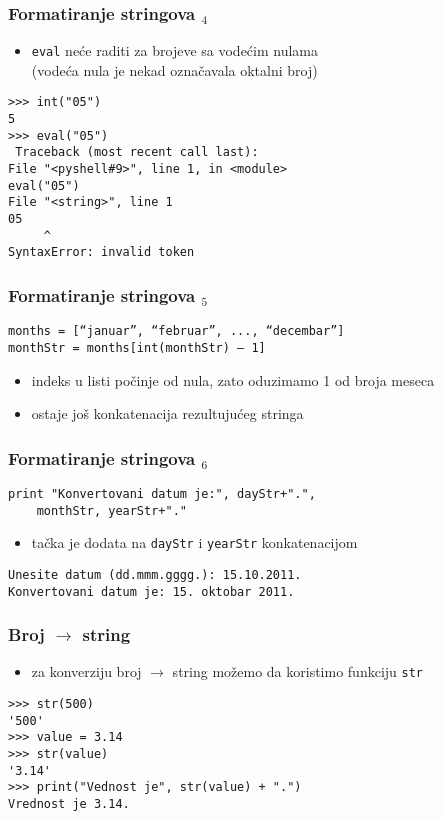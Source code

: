 \documentclass[utf8,compress]{beamer}
\begin{document}
\begin{frame}[fragile]
  \frametitle{Formatiranje stringova $_4$}
  \begin{itemize}
    \item \texttt{eval} neće raditi za brojeve sa vodećim nulama\\ (vodeća nula je nekad označavala oktalni broj)
  \end{itemize}
\begin{verbatim}
>>> int("05")
5
>>> eval("05")
 Traceback (most recent call last):
File "<pyshell#9>", line 1, in <module>
eval("05")
File "<string>", line 1
05
     ^
SyntaxError: invalid token
\end{verbatim}
\end{frame}

\begin{frame}[fragile]
  \frametitle{Formatiranje stringova $_5$}
\begin{verbatim}
months = [“januar”, “februar”, ..., “decembar”]
monthStr = months[int(monthStr) – 1]
\end{verbatim}
  \begin{itemize}
    \item indeks u listi počinje od nula, zato oduzimamo 1 od broja meseca
    \item ostaje još konkatenacija rezultujućeg stringa
  \end{itemize}
\end{frame}

\begin{frame}[fragile]
  \frametitle{Formatiranje stringova $_6$}
\begin{verbatim}
print "Konvertovani datum je:", dayStr+".", 
    monthStr, yearStr+"."
\end{verbatim}
  \begin{itemize}
    \item tačka je dodata na \texttt{dayStr} i \texttt{yearStr} konkatenacijom
  \end{itemize}
\begin{verbatim}
Unesite datum (dd.mmm.gggg.): 15.10.2011.
Konvertovani datum je: 15. oktobar 2011.
\end{verbatim}
\end{frame}

\begin{frame}[fragile]
  \frametitle{Broj $\rightarrow$ string}
  \begin{itemize}
    \item za konverziju broj $\rightarrow$ string možemo da koristimo funkciju \texttt{str}
  \end{itemize}
\begin{verbatim}
>>> str(500)
'500'
>>> value = 3.14
>>> str(value)
'3.14'
>>> print("Vednost je", str(value) + ".")
Vrednost je 3.14.
\end{verbatim}
\end{frame}
\end{document}

